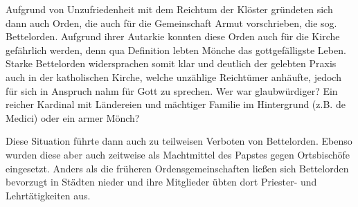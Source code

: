 \documentclass[10pt,a4paper,oneside,ngerman,numbers=noenddot]{scrartcl}
\begin{document}
Aufgrund von Unzufriedenheit mit dem Reichtum der Klöster gründeten sich dann
auch Orden, die auch für die Gemeinschaft Armut vorschrieben, die sog. Bettelorden.
Aufgrund ihrer Autarkie konnten diese Orden auch für die Kirche gefährlich werden,
denn qua Definition lebten Mönche das gottgefälligste Leben. Starke Bettelorden
widersprachen somit klar und deutlich der gelebten Praxis auch in der katholischen
Kirche, welche unzählige Reichtümer anhäufte, jedoch für sich in Anspruch nahm
für Gott zu sprechen. Wer war glaubwürdiger? Ein reicher Kardinal mit Ländereien
und mächtiger Familie im Hintergrund (z.B. de Medici) oder ein armer Mönch?

Diese Situation führte dann auch zu teilweisen Verboten von Bettelorden. Ebenso
wurden diese aber auch zeitweise als Machtmittel des Papstes gegen Ortsbischöfe
eingesetzt. Anders als die früheren Ordensgemeinschaften ließen sich Bettelorden
bevorzugt in Städten nieder und ihre Mitglieder übten dort Priester- und Lehrtätigkeiten
aus.
\end{document}

